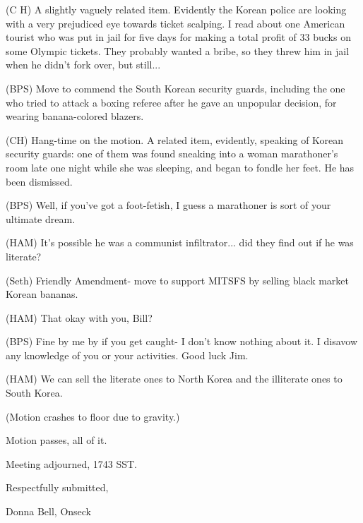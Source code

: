 \documentclass[12pt]{article}
\begin{document}
(C H) A slightly vaguely related item. Evidently the Korean police are looking with a very prejudiced eye towards ticket scalping. I read about one American tourist who was put in jail for five days for making a total profit of 33 bucks on some Olympic tickets. They probably wanted a bribe, so they threw him in jail when he didn't fork over, but still...

(BPS) Move to commend the South Korean security guards, including the one who tried to attack a boxing referee after he gave an unpopular decision, for wearing banana-colored blazers.

(CH) Hang-time on the motion. A related item, evidently, speaking of Korean security guards: one of them was found sneaking into a woman marathoner's room late one night while she was sleeping, and began to fondle her feet. He has been dismissed.

(BPS) Well, if you've got a foot-fetish, I guess a marathoner is sort of your ultimate dream.

(HAM) It's possible he was a communist infiltrator... did they find out if he was literate?

(Seth) Friendly Amendment- move to support MITSFS by selling black market Korean bananas.

(HAM) That okay with you, Bill?

(BPS) Fine by me by if you get caught- I don't know nothing about it. I disavow any knowledge of you or your activities. Good luck Jim.

(HAM) We can sell the literate ones to North Korea and the illiterate ones to South Korea.

(Motion crashes to floor due to gravity.)

Motion passes, all of it.

\vspace{12pt}

\noindent
Meeting adjourned, 1743 SST.

\vspace{18pt}

\centerline{Respectfully submitted,}
\centerline{Donna Bell, Onseck}
\end{document}
